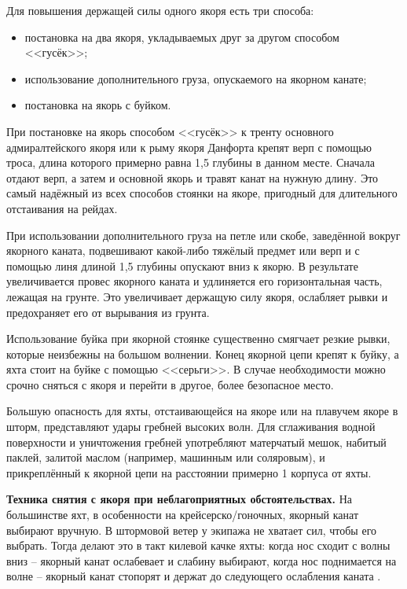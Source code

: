 Для повышения держащей силы одного якоря есть три способа: 
\begin{itemize}
\item постановка на два якоря, укладываемых друг за другом способом <<гусёк>>; 
\item использование дополнительного груза, опускаемого на якорном канате; 
\item постановка на якорь с буйком. 
\end{itemize}

При постановке на якорь способом <<гусёк>> к тренту основного адмиралтейского якоря или к рыму якоря Данфорта крепят верп с помощью троса, длина которого примерно равна 1,5 глубины в данном месте. Сначала отдают верп, а затем и основной якорь и травят канат на нужную длину. Это самый надёжный из всех способов стоянки на якоре, пригодный для длительного отстаивания на рейдах.

При использовании дополнительного груза на петле или скобе, заведённой вокруг якорного каната, подвешивают какой-либо тяжёлый предмет или верп и с помощью линя длиной 1,5 глубины опускают вниз к якорю. В результате увеличивается провес якорного каната и удлиняется его горизонтальная часть, лежащая на грунте. Это увеличивает держащую силу якоря, ослабляет рывки и предохраняет его от вырывания из грунта.

Использование буйка при якорной стоянке существенно смягчает резкие рывки, которые неизбежны на большом волнении. Конец якорной цепи крепят к буйку, а яхта стоит на буйке с помощью <<серьги>>. В случае необходимости можно срочно сняться с якоря и перейти в другое, более безопасное место.

Большую опасность для яхты, отстаивающейся на якоре или на плавучем якоре в шторм, представляют удары гребней высоких волн. Для сглаживания водной поверхности и уничтожения гребней употребляют матерчатый мешок, набитый паклей, залитой маслом (например, машинным или соляровым), и прикреплённый к якорной цепи на расстоянии примерно 1 корпуса от яхты. 

\textbf{Техника снятия с якоря при неблагоприятных обстоятельствах.} На большинстве яхт, в особенности на крейсерско\-/гоночных, якорный канат выбирают вручную. В штормовой ветер у экипажа не хватает сил, чтобы его выбрать. Тогда делают это в такт килевой качке яхты: когда нос сходит с волны вниз \--- якорный канат ослабевает и слабину выбирают, когда нос поднимается на волне \--- якорный канат стопорят и держат до следующего ослабления каната . 

